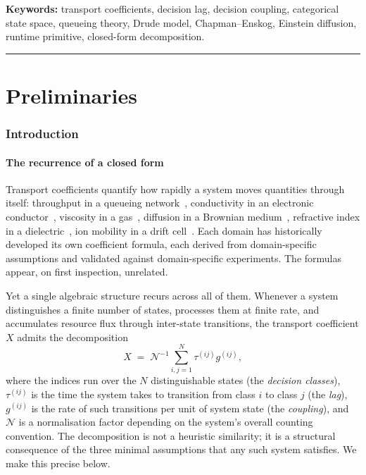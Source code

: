 \documentclass[twocolumn,11pt,a4paper]{article}
\newcommand{\TP}{X}
\newcommand{\Norm}{\mathcal{N}}
\newcommand{\lag}{\tau}
\newcommand{\cpl}{g}
\newcommand{\classcount}{N}
\begin{document}
\noindent\textbf{Keywords:} transport coefficients, decision lag, decision coupling, categorical state space, queueing theory, Drude model, Chapman--Enskog, Einstein diffusion, runtime primitive, closed-form decomposition.

\tableofcontents

\vspace{6pt}
\hrule
\vspace{6pt}

\part{Preliminaries}

\section{Introduction}
\label{sec:intro}

\subsection{The recurrence of a closed form}

Transport coefficients quantify how rapidly a system moves quantities through itself: throughput in a queueing network~\citep{kleinrock1975,jackson1957}, conductivity in an electronic conductor~\citep{drude1900,sommerfeld1928,ashcroft1976}, viscosity in a gas~\citep{chapman1970,maxwell1867}, diffusion in a Brownian medium~\citep{einstein1905brownian,smoluchowski1906}, refractive index in a dielectric~\citep{lorenz1880,lorentz1880}, ion mobility in a drift cell~\citep{mason1988transport}. Each domain has historically developed its own coefficient formula, each derived from domain-specific assumptions and validated against domain-specific experiments. The formulas appear, on first inspection, unrelated.

Yet a single algebraic structure recurs across all of them. Whenever a system distinguishes a finite number of states, processes them at finite rate, and accumulates resource flux through inter-state transitions, the transport coefficient $\TP$ admits the decomposition
\begin{equation}
\TP \;=\; \Norm^{-1} \sum_{i,j=1}^{\classcount} \lag^{(ij)} \cpl^{(ij)},
\label{eq:utl-intro}
\end{equation}
where the indices run over the $\classcount$ distinguishable states (the \emph{decision classes}), $\lag^{(ij)}$ is the time the system takes to transition from class $i$ to class $j$ (the \emph{lag}), $\cpl^{(ij)}$ is the rate of such transitions per unit of system state (the \emph{coupling}), and $\Norm$ is a normalisation factor depending on the system's overall counting convention. The decomposition is not a heuristic similarity; it is a structural consequence of the three minimal assumptions that any such system satisfies. We make this precise below.
\end{document}
